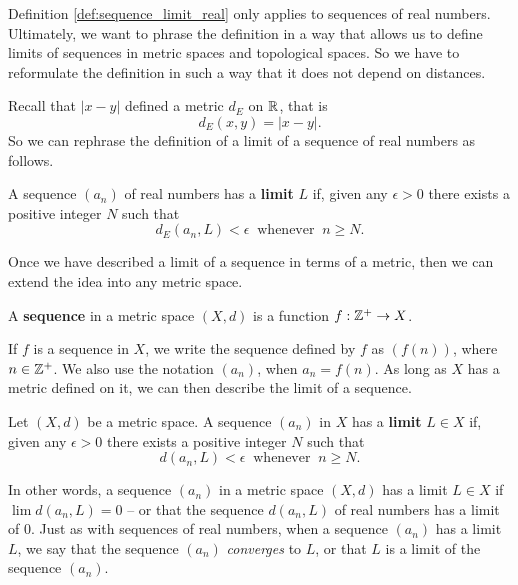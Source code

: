 Definition \ref{def:sequence_limit_real} only applies to sequences of real numbers. Ultimately, we want to phrase the definition in a way that allows us to define limits of sequences in metric spaces and topological spaces. So we have to reformulate the definition in such a way that it does not depend on distances. 

Recall that $| x-y |$ defined a metric $d_E$ on $\mathbb{R}$, that is 
\[d_E(x,y) = | x-y |.\]
So we can rephrase the definition of a limit of a sequence of real numbers as follows.

\begin{definition} A sequence $(a_n)$ of real numbers has a \textbf{limit} $L$ if, given any $\epsilon > 0$ there exists a positive integer $N$ such that 
\[d_E(a_n, L) < \epsilon \ \text{ whenever } \ n \geq N.\]
\end{definition}

Once we have described a limit of a sequence in terms of a metric, then we can extend the idea into any metric space. 

\begin{definition} A \textbf{sequence} in a metric space $(X,d)$ is a function $f: \mathbb{Z}^+ \to X$.  
\end{definition}

If $f$ is a sequence in $X$, we write the sequence defined by $f$ as $(f(n))$, where $n \in \mathbb{Z}^+$. We also use the notation $(a_n)$, when $a_n = f(n)$. As long as $X$ has a metric defined on it, we can then describe the limit of a sequence.

\begin{definition} Let $(X,d)$ be a metric space. A sequence $(a_n)$ in $X$ has a \textbf{limit} $L \in X$ if, given any $\epsilon > 0$ there exists a positive integer $N$ such that 
\[d(a_n, L) < \epsilon \ \text{ whenever } \ n \geq N.\]
\end{definition}

In other words, a sequence  $(a_n)$ in a metric space $(X,d)$ has a limit $L \in X$ if $\lim d(a_n,L) = 0$ -- or that the sequence $d(a_n,L)$ of real numbers has a limit of $0$. Just as with sequences of real numbers, when a sequence $(a_n)$ has a limit $L$, we say that the sequence $(a_n)$ \emph{converges} to $L$, or that $L$ is a limit of the sequence $(a_n)$. 

